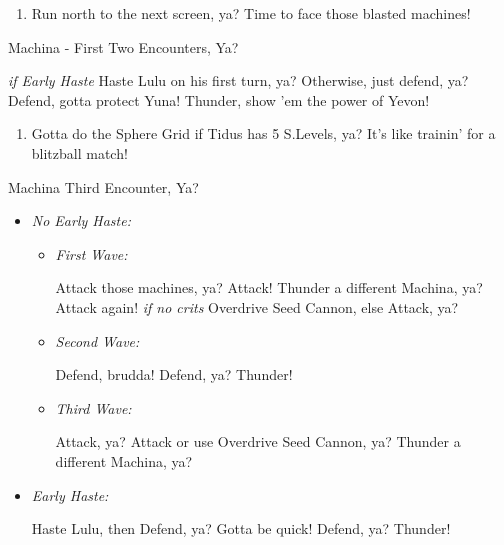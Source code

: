 \begin{enumerate}[resume]
    \item Run north to the next screen, ya? Time to face those blasted machines!
\end{enumerate}
\begin{battle}{Machina - First Two Encounters, Ya?}
    \begin{itemize}
        \tidusf \textit{if Early Haste} Haste Lulu on his first turn, ya? Otherwise, just defend, ya?
        \kimahrif Defend, gotta protect Yuna!
        \luluf Thunder, show 'em the power of Yevon!
    \end{itemize}
\end{battle}
\begin{enumerate}[resume]
    \item Gotta do the Sphere Grid if Tidus has 5 S.Levels, ya? It's like trainin' for a blitzball match!
\end{enumerate}
\begin{battle}{Machina Third Encounter, Ya?}
    \begin{itemize}
        \item \textit{No Early Haste:}
        \begin{itemize}
            \item \textit{First Wave:}
            \begin{itemize}
                \tidusf Attack those machines, ya?
                \kimahrif Attack!
                \luluf Thunder a different Machina, ya?
                \tidusf Attack again!
                \kimahrif \textit{if no crits} Overdrive Seed Cannon, else Attack, ya?
            \end{itemize}
            \item \textit{Second Wave:}
            \begin{itemize}
                \tidusf Defend, brudda!
                \kimahrif Defend, ya?
                \luluf Thunder!
            \end{itemize}
            \item \textit{Third Wave:}
            \begin{itemize}
                \tidusf Attack, ya?
                \kimahrif Attack or use Overdrive Seed Cannon, ya?
                \luluf Thunder a different Machina, ya?
            \end{itemize}
        \end{itemize}
        \item \textit{Early Haste:}
        \begin{itemize}
            \tidusf Haste Lulu, then Defend, ya? Gotta be quick!
            \kimahrif Defend, ya?
            \luluf Thunder!
        \end{itemize}
    \end{itemize}
\end{battle}
